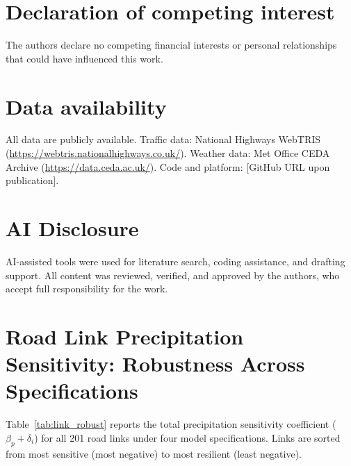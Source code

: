 \documentclass[review,authoryear]{elsarticle}
\begin{document}
\section*{Declaration of competing interest}

The authors declare no competing financial interests or personal relationships that could have influenced this work.

\section*{Data availability}

All data are publicly available. Traffic data: National Highways WebTRIS (\url{https://webtris.nationalhighways.co.uk/}). Weather data: Met Office CEDA Archive (\url{https://data.ceda.ac.uk/}). Code and platform: [GitHub URL upon publication].

\section*{AI Disclosure}

AI-assisted tools were used for literature search, coding assistance, and drafting support. All content was reviewed, verified, and approved by the authors, who accept full responsibility for the work.





\appendix

\section{Road Link Precipitation Sensitivity: Robustness Across Specifications}
\label{app:coefficients}

Table~\ref{tab:link_robust} reports the total precipitation sensitivity coefficient ($\beta_p + \delta_i$) for all 201 road links under four model specifications. Links are sorted from most sensitive (most negative) to most resilient (least negative).
\end{document}
